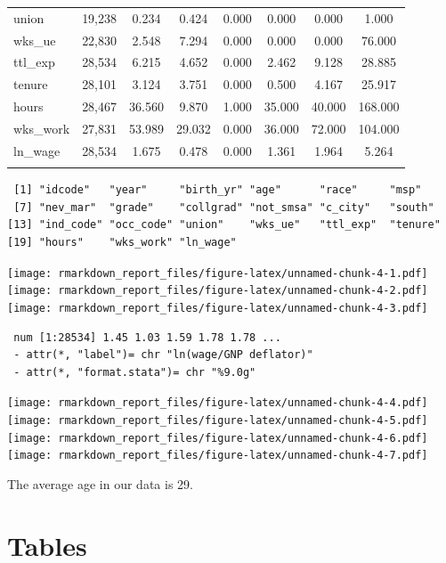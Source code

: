 \documentclass[
  12pt,
]{article}
\begin{document}
\begin{table}[ht]
\begin{tabular}{@{\extracolsep{5pt}}lccccccc}
union & 19,238 & 0.234 & 0.424 & 0.000 & 0.000 & 0.000 & 1.000 \\ 
wks\_ue & 22,830 & 2.548 & 7.294 & 0.000 & 0.000 & 0.000 & 76.000 \\ 
ttl\_exp & 28,534 & 6.215 & 4.652 & 0.000 & 2.462 & 9.128 & 28.885 \\ 
tenure & 28,101 & 3.124 & 3.751 & 0.000 & 0.500 & 4.167 & 25.917 \\ 
hours & 28,467 & 36.560 & 9.870 & 1.000 & 35.000 & 40.000 & 168.000 \\ 
wks\_work & 27,831 & 53.989 & 29.032 & 0.000 & 36.000 & 72.000 & 104.000 \\ 
ln\_wage & 28,534 & 1.675 & 0.478 & 0.000 & 1.361 & 1.964 & 5.264 \\ 
\hline \\[-1.8ex] 
\end{tabular} 
\end{table}

\begin{verbatim}
 [1] "idcode"   "year"     "birth_yr" "age"      "race"     "msp"     
 [7] "nev_mar"  "grade"    "collgrad" "not_smsa" "c_city"   "south"   
[13] "ind_code" "occ_code" "union"    "wks_ue"   "ttl_exp"  "tenure"  
[19] "hours"    "wks_work" "ln_wage" 
\end{verbatim}

\texttt{[image: rmarkdown\_report\_files/figure-latex/unnamed-chunk-4-1.pdf]} \texttt{[image: rmarkdown\_report\_files/figure-latex/unnamed-chunk-4-2.pdf]} \texttt{[image: rmarkdown\_report\_files/figure-latex/unnamed-chunk-4-3.pdf]}

\begin{verbatim}
 num [1:28534] 1.45 1.03 1.59 1.78 1.78 ...
 - attr(*, "label")= chr "ln(wage/GNP deflator)"
 - attr(*, "format.stata")= chr "%9.0g"
\end{verbatim}

\texttt{[image: rmarkdown\_report\_files/figure-latex/unnamed-chunk-4-4.pdf]} \texttt{[image: rmarkdown\_report\_files/figure-latex/unnamed-chunk-4-5.pdf]} \texttt{[image: rmarkdown\_report\_files/figure-latex/unnamed-chunk-4-6.pdf]} \texttt{[image: rmarkdown\_report\_files/figure-latex/unnamed-chunk-4-7.pdf]}

The average age in our data is 29.

\hypertarget{sec:tables}{%
\section{Tables}\label{sec:tables}}
\end{document}
